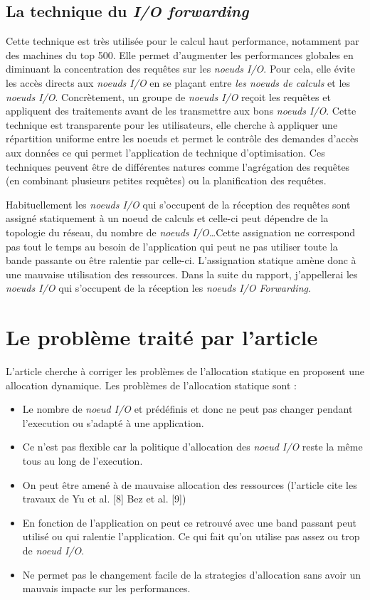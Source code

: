 \documentclass[10pt, a4paper]{article}
\begin{document}
\subsection{La technique du \emph{I/O forwarding}}

Cette technique est très utilisée pour le calcul haut performance, notamment par des machines du top 500\cite{}. Elle permet d'augmenter les performances globales en diminuant la concentration des requêtes sur les \emph{noeuds I/O}. Pour cela, elle évite les accès directs aux \emph{noeuds I/O} en se plaçant entre \emph{les noeuds de calculs} et les \emph{noeuds I/O}. Concrètement, un groupe de \emph{noeuds I/O} reçoit les requêtes et appliquent des traitements avant de les transmettre aux bons \emph{noeuds I/O}. Cette technique est transparente pour les utilisateurs, elle cherche à appliquer une répartition uniforme entre les noeuds et permet le contrôle des demandes d'accès aux données ce qui permet l'application de technique d'optimisation. Ces techniques peuvent être de différentes natures comme l'agrégation des requêtes (en combinant plusieurs petites requêtes) ou la planification des requêtes.

Habituellement les \emph{noeuds I/O} qui s'occupent de la réception des requêtes sont assigné statiquement à un noeud de calculs et celle-ci peut dépendre de la topologie du réseau, du nombre de \emph{noeuds I/O}\dots Cette assignation ne correspond pas tout le temps au besoin de l'application qui peut ne pas utiliser toute la bande passante ou être ralentie par celle-ci. L'assignation statique amène donc à une mauvaise utilisation des ressources. Dans la suite du rapport, j'appellerai les \emph{noeuds I/O} qui s'occupent de la réception les \emph{noeuds I/O Forwarding}.

\section{Le problème traité par l'article}

L'article cherche à corriger les problèmes de l'allocation statique en proposent une allocation dynamique.
Les problèmes de l'allocation statique sont :
\begin{itemize}
  \item Le nombre de \emph{noeud I/O} et prédéfinis et donc ne peut pas changer pendant l'execution ou s'adapté à une application.
  \item Ce n'est pas flexible car la politique d'allocation des \emph{noeud I/O} reste la même tous au long de l'execution.
  \item On peut être amené à de mauvaise allocation des ressources (l'article cite les travaux de Yu et al. [8] Bez et al. [9])\cite{}
  \item En fonction de l'application on peut ce retrouvé avec une band passant peut utilisé ou qui ralentie l'application. Ce qui fait qu'on utilise pas assez ou trop de \emph{noeud I/O}.
  \item Ne permet pas le changement facile de la strategies d'allocation sans avoir un mauvais impacte sur les performances.
\end{itemize}
\end{document}
